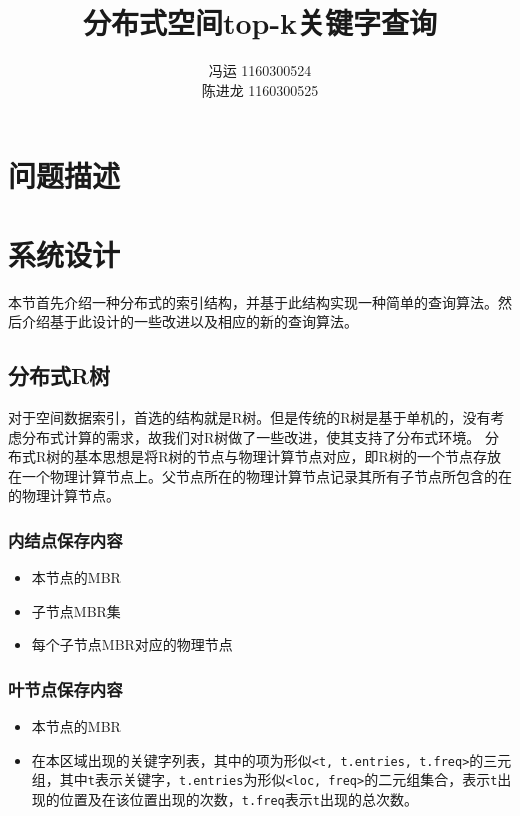 \documentclass{elegantpaper}
\title{分布式空间top-k关键字查询}
\author{
    冯运 1160300524 %
    \\[0.5ex] %
    陈进龙 1160300525 %
}
\begin{document}
\maketitle

\begin{abstract}
\end{abstract}

\section{问题描述}

\section{系统设计}

本节首先介绍一种分布式的索引结构，并基于此结构实现一种简单的查询算法。然后介绍基于此设计的一些改进以及相应的新的查询算法。

\subsection{分布式R树}

对于空间数据索引，首选的结构就是R树。但是传统的R树是基于单机的，没有考虑分布式计算的需求，故我们对R树做了一些改进，使其支持了分布式环境。
分布式R树的基本思想是将R树的节点与物理计算节点对应，即R树的一个节点存放在一个物理计算节点上。父节点所在的物理计算节点记录其所有子节点所包含的在的物理计算节点。

\subsubsection{内结点保存内容}

\begin{itemize}

    \item 本节点的MBR

    \item 子节点MBR集

    \item 每个子节点MBR对应的物理节点
    
\end{itemize}

\subsubsection{叶节点保存内容}

\begin{itemize}

    \item 本节点的MBR
    
    \item 在本区域出现的关键字列表，其中的项为形似\verb|<t, t.entries, t.freq>|的三元组，其中\verb|t|表示关键字，\verb|t.entries|为形似\verb|<loc, freq>|的二元组集合，表示\verb|t|出现的位置及在该位置出现的次数，\verb|t.freq|表示\verb|t|出现的总次数。

\end{itemize}
\end{document}
